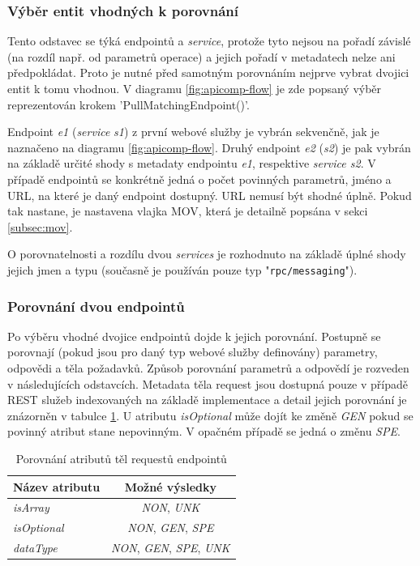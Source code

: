 \documentclass[czech,DP]{thesiskiv}
\begin{document}
\subsubsection{Výběr entit vhodných k porovnání}
\label{sec:pick-matching-entities}

Tento odstavec se týká endpointů a \textit{service}, protože tyto nejsou na pořadí závislé (na rozdíl např. od parametrů operace) a jejich pořadí v metadatech nelze ani předpokládat. Proto je nutné před samotným porovnáním nejprve vybrat dvojici entit k tomu vhodnou. V diagramu \ref{fig:apicomp-flow} je zde popsaný výběr reprezentován krokem 'PullMatchingEndpoint()'. 

Endpoint \textit{e1} (\textit{service} \textit{s1})  z první webové služby je vybrán sekvenčně, jak je naznačeno na diagramu \ref{fig:apicomp-flow}. Druhý endpoint \textit{e2} (\textit{s2}) je pak vybrán na základě určité shody s metadaty endpointu \textit{e1}, respektive \textit{service s2}. V případě endpointů se konkrétně jedná o počet povinných parametrů, jméno a URL, na které je daný endpoint dostupný. URL nemusí být shodné úplně. Pokud tak nastane, je nastavena vlajka MOV, která je detailně popsána v sekci \ref{subsec:mov}.

O porovnatelnosti a rozdílu dvou \textit{services} je rozhodnuto na základě úplné shody jejich jmen a typu (současně je používán pouze typ "\verb|rpc/messaging|").

\subsubsection{Porovnání dvou endpointů}
Po výběru vhodné dvojice endpointů dojde k jejich porovnání. Postupně se porovnají (pokud jsou pro daný typ webové služby definovány) parametry, odpovědi a těla požadavků. Způsob porovnání parametrů a odpovědí je rozveden v následujících odstavcích. Metadata těla request jsou dostupná pouze v případě REST služeb indexovaných na základě implementace a detail jejich porovnání je znázorněn v tabulce \ref{tab:req-body-cmp}. U atributu \textit{isOptional} může dojít ke změně \textit{GEN} pokud se povinný atribut stane nepovinným. V opačném případě se jedná o změnu \textit{SPE}.

\begin{table}[h]
	\centering
	\begin{tabular}{|l|c|}
		\hline
		Název atributu  & Možné výsledky \\
		\hline
		\hline
		\textit{isArray} & \textit{NON}, \textit{UNK} \\
		\hline
		\textit{isOptional} & \textit{NON}, \textit{GEN}, \textit{SPE} \\
		\hline
		\textit{dataType} & \textit{NON}, \textit{GEN}, \textit{SPE}, \textit{UNK} \\
		\hline
	\end{tabular}
	\caption{Porovnání atributů těl requestů endpointů}
	\label{tab:req-body-cmp}
\end{table}
\end{document}
